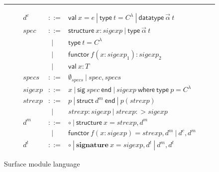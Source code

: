 
\begin{figure}
\hrule
\[
\begin{array}{rcl}
d^c & ::= & \mathsf{val}~
x=e~|~\mathsf{type}~t=C^\lambda~|~\mathsf{datatype}~\vec{\alpha}~t\\
spec & ::= & \mathsf{structure}~x :
        sigexp~|~\mathsf{type}~\vec{\alpha}~t\\
& ~~| & \mathsf{type}~t = C^\lambda\\ 
& ~~| & \mathsf{functor}~f(x:sigexp_1) : sigexp_2\\
& ~~| & \mathsf{val}~x:T\\
specs & ::= & \emptyset_{specs}~|~spec, specs\\
sigexp & ::= &
        x~|~\mathsf{sig}~spec~\mathsf{end}~|~sigexp~\mathsf{where~
          type}~p=C^\lambda\\
strexp & ::= & p~|~\mathsf{struct} ~d^m~\mathsf{end}
        ~|~p(strexp)\\
& ~~| & strexp:sigexp~|~strexp:>sigexp\\
d^m & ::= & \circ~|~\mathsf{structure}~x = strexp, d^m\\
& ~~| & \mathsf{functor}
       ~f(x:sigexp)=strexp, d^m~|~d^c, d^m\\
d^t & ::= & \circ~|~\mathbf{signature}~x=sigexp,d^t~|~d^m,d^t
\end{array}
\]

\caption{Surface module language}
\label{fig:modlang}
\end{figure}

